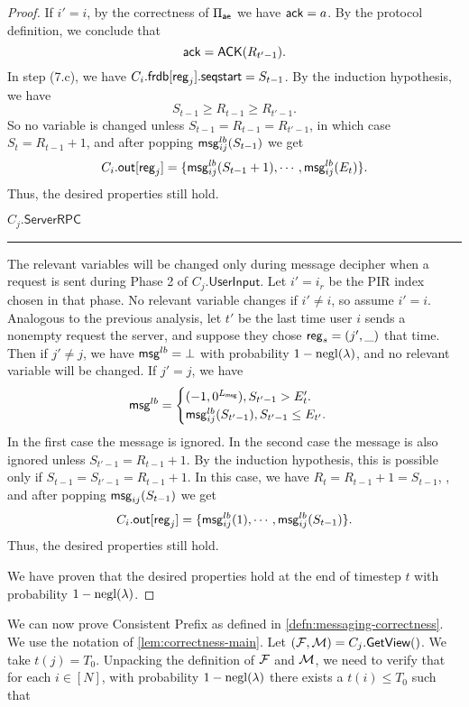 \begin{proof}
If $i' = i$, by the correctness of $\Pi_{\mathsf{ae}}$ we have $\mathsf{ack} = a$. By the protocol definition, we conclude that
$$\mathsf{ack} = \mathsf{ACK}(R_{t' - 1}).$$
In step (7.c), we have $C_i.\mathsf{frdb}[\mathsf{reg}_j].\mathsf{seqstart} = S_{t - 1}$. By the induction hypothesis, we have
$$S_{t - 1} \geq R_{t - 1} \geq R_{t' - 1}.$$
So no variable is changed unless $S_{t - 1} = R_{t - 1} = R_{t' - 1}$, in which case $S_t = R_{t - 1} + 1$, and after popping $\mathsf{msg}^{lb}_{ij}(S_{t - 1})$ we get
$$C_i.\mathsf{out}[\mathsf{reg}_j] = \{\mathsf{msg}^{lb}_{ij}(S_{t - 1} + 1), \cdots, \mathsf{msg}^{lb}_{ij}(E_t)\}.$$
Thus, the desired properties still hold.

\vspace{10pt}
$C_j.\mathsf{ServerRPC}$
\hrule
The relevant variables will be changed only during message decipher when a request is sent during Phase 2 of $C_j.\mathsf{UserInput}$. Let $i' = i_r$ be the PIR index chosen in that phase. No relevant variable changes if $i' \neq i$, so assume $i' = i$. Analogous to the previous analysis, let $t'$ be the last time user $i$ sends a nonempty request the server, and suppose they chose $\mathsf{reg}_s = (j', \_)$ that time. Then
if $j' \neq j$, we have $\mathsf{msg}^{lb} = \bot$ with probability $1 - \operatorname{negl}(\lambda)$, and no relevant variable will be changed. If $j' = j$, we have
$$\mathsf{msg}^{lb} = \begin{cases}
(-1, 0^{L_{\mathsf{msg}}}), S_{t' - 1} > E_t'. \\
\mathsf{msg}_{ij}^{lb}(S_{t' - 1}), S_{t' - 1} \leq E_{t'}. 
\end{cases}$$
In the first case the message is ignored. In the second case the message is also ignored unless $S_{t' - 1} = R_{t - 1} + 1$. By the induction hypothesis, this is possible only if $S_{t - 1} = S_{t' - 1} = R_{t - 1} + 1$. In this case, we have $R_t = R_{t - 1} + 1 = S_{t - 1}$, , and after popping $\mathsf{msg}_{ij}(S_{t - 1})$ we get
$$C_i.\mathsf{out}[\mathsf{reg}_j] = \{\mathsf{msg}^{lb}_{ij}(1), \cdots, \mathsf{msg}^{lb}_{ij}(S_{t - 1})\}.$$
Thus, the desired properties still hold.

We have proven that the desired properties hold at the end of timestep $t$ with probability $1 - \operatorname{negl}(\lambda)$.
\end{proof}
We can now prove Consistent Prefix as defined in \cref{defn:messaging-correctness}. We use the notation of \cref{lem:correctness-main}. Let $(\mathcal{F}, \mathcal{M}) = C_j.\mathsf{GetView}()$. We take $t(j) = T_0$. Unpacking the definition of $\mathcal{F}$ and $\mathcal{M}$, we need to verify that for each $i \in [N]$, with probability $1 - \operatorname{negl}(\lambda)$ there exists a $t(i) \leq T_0$ such that
 
